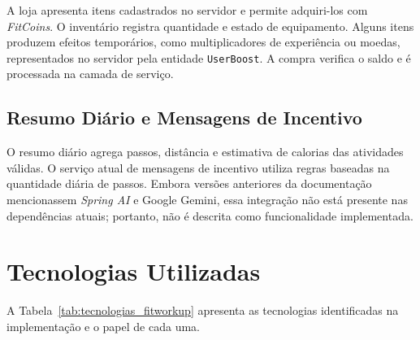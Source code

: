 A loja apresenta itens cadastrados no servidor e permite adquiri-los com \textit{FitCoins}. O inventário registra quantidade e estado de equipamento. Alguns itens produzem efeitos temporários, como multiplicadores de experiência ou moedas, representados no servidor pela entidade \texttt{UserBoost}. A compra verifica o saldo e é processada na camada de serviço.

\subsection{Resumo Diário e Mensagens de Incentivo}

O resumo diário agrega passos, distância e estimativa de calorias das atividades válidas. O serviço atual de mensagens de incentivo utiliza regras baseadas na quantidade diária de passos. Embora versões anteriores da documentação mencionassem \textit{Spring AI} e Google Gemini, essa integração não está presente nas dependências atuais; portanto, não é descrita como funcionalidade implementada.

\section{Tecnologias Utilizadas}
\label{sec:fitworkup_tecnologias}

A Tabela~\ref{tab:tecnologias_fitworkup} apresenta as tecnologias identificadas na implementação e o papel de cada uma.

